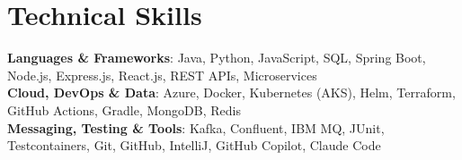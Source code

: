 \section{Technical Skills}
\begin{itemize}[leftmargin=0.15in, label={}]
    \small{\item{
        \textbf{Languages \& Frameworks}{: Java, Python, JavaScript, SQL, Spring Boot, Node.js, Express.js, React.js, REST APIs, Microservices} \\
        \textbf{Cloud, DevOps \& Data}{: Azure, Docker, Kubernetes (AKS), Helm, Terraform, GitHub Actions, Gradle, MongoDB, Redis} \\
        \textbf{Messaging, Testing \& Tools}{: Kafka, Confluent, IBM MQ, JUnit, Testcontainers, Git, GitHub, IntelliJ, GitHub Copilot, Claude Code}
    }}
\end{itemize}